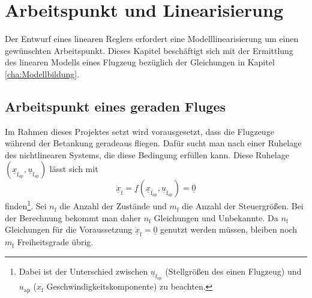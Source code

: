 \chapter{Arbeitspunkt und Linearisierung}\label{cha:Linearisierung}
Der Entwurf eines linearen Reglers erfordert eine Modelllinearisierung um einen gewünschten Arbeitspunkt. Dieses Kapitel beschäftigt sich mit der Ermittlung des linearen Modells eines Flugzeug bezüglich der Gleichungen in Kapitel \ref{cha:Modellbildung}.
\section{Arbeitspunkt eines geraden Fluges}
Im Rahmen dieses Projektes setzt wird vorausgesetzt, dass die Flugzeuge während der Betankung geradeaus fliegen. Dafür sucht man nach einer Ruhelage des nichtlinearen Systems, die diese Bedingung erfüllen kann. Diese Ruhelage $(\underline{x}_\mathrm{f_{ap}},\underline{u}_\mathrm{f_{ap}})$ lässt sich mit
\begin{equation}
\underline{\dot{x}}_\mathrm{f} = \underline{f}(\underline{x}_\mathrm{f_{ap}},\underline{u}_\mathrm{f_{ap}}) = \underline{0}
\end{equation}
finden\footnote{Dabei ist der Unterschied zwischen $\underline{u}_\mathrm{f_{ap}}$ (Stellgrö{\ss}en des einen Flugzeug) und $u_\mathrm{ap}$ ($x_\mathrm{f}$ Geschwindigkeitskomponente) zu beachten.}. Sei $n_\mathrm{f}$ die Anzahl der Zustände und $m_\mathrm{f}$ die Anzahl der Steuergrö{\ss}en. Bei der Berechnung bekommt man daher $n_\mathrm{f}$ Gleichungen und Unbekannte. Da $n_\mathrm{f}$ Gleichungen für die Voraussetzung $\underline{\dot{x}}_\mathrm{f} = \underline{0}$ genutzt werden müssen, bleiben noch $m_\mathrm{f}$ Freiheitsgrade übrig.\\

